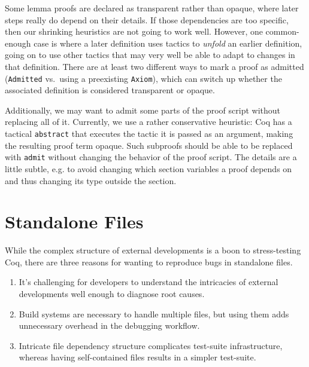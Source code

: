 \documentclass[a4paper,USenglish,cleveref,autoref,thm-restate]{lipics-v2021}
\begin{document}
Some lemma proofs are declared as transparent rather than opaque, where later steps really do depend on their details.
If those dependencies are too specific, then our shrinking heuristics are not going to work well.
However, one common-enough case is where a later definition uses tactics to \emph{unfold} an earlier definition, going on to use other tactics that may very well be able to adapt to changes in that definition.
There are at least two different ways to mark a proof as admitted (\texttt{Admitted} vs.\ using a preexisting \texttt{Axiom}), which can switch up whether the associated definition is considered transparent or opaque.

Additionally, we may want to admit some parts of the proof script without replacing all of it.
Currently, we use a rather conservative heuristic:
Coq has a tactical \verb|abstract| that executes the tactic it is passed as an argument, making the resulting proof term opaque.
Such subproofs should be able to be replaced with \verb|admit| without changing the behavior of the proof script.
The details are a little subtle, e.g. to avoid changing which section variables a proof depends on and thus changing its type outside the section.

\label{text:ltac-fragment:orig}

\section{Standalone Files}\label{sec:standalone}


While the complex structure of external developments is a boon to stress-testing Coq, there are three reasons for wanting to reproduce bugs in standalone files.
\begin{enumerate}
\item It's challenging for developers to understand the intricacies of external developments well enough to diagnose root causes.
\item  Build systems are necessary to handle multiple files, but using them adds unnecessary overhead in the debugging workflow.
\item Intricate file dependency structure complicates test-suite infrastructure, whereas having self-contained files results in a simpler test-suite.
\end{enumerate}
\end{document}
